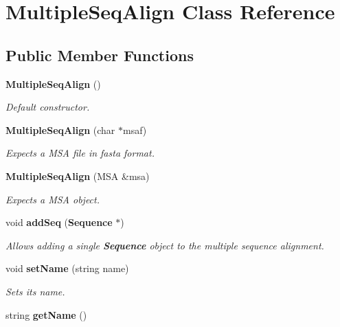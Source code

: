\section{Multiple\-Seq\-Align Class Reference}
\label{classMultipleSeqAlign}
\subsection*{Public Member Functions}
\begin{CompactItemize}
\item 
{\bf Multiple\-Seq\-Align} ()\label{classMultipleSeqAlign_a0}

\begin{CompactList}\small\item\em Default constructor. \item\end{CompactList}\item 
{\bf Multiple\-Seq\-Align} (char $\ast$msaf)
\begin{CompactList}\small\item\em Expects a MSA file in fasta format. \item\end{CompactList}\item 
{\bf Multiple\-Seq\-Align} (MSA \&msa)\label{classMultipleSeqAlign_a2}

\begin{CompactList}\small\item\em Expects a MSA object. \item\end{CompactList}\item 
void {\bf add\-Seq} ({\bf Sequence} $\ast$)\label{classMultipleSeqAlign_a3}

\begin{CompactList}\small\item\em Allows adding a single {\bf Sequence} object to the multiple sequence alignment. \item\end{CompactList}\item 
void {\bf set\-Name} (string name)\label{classMultipleSeqAlign_a4}

\begin{CompactList}\small\item\em Sets its name. \item\end{CompactList}\item 
string {\bf get\-Name} ()\label{classMultipleSeqAlign_a5}


\end{CompactItemize}
